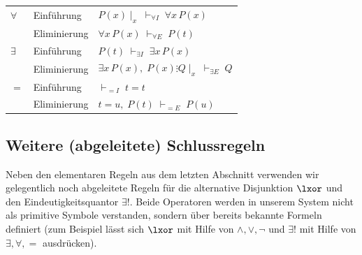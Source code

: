 \documentclass[main.tex]{subfiles}
\begin{document}
\begin{center}
\begin{tabularx}{\textwidth}{@{}l l X@{}}
    $\forall$
      & Einführung
      & \label{rule:UI}%
        \(P(x)\mid_x \;\vdash_{\forall I}\; \forall x\,P(x)\) \\[0.6ex]
      & Eliminierung
      & \label{rule:UE}%
        \(\forall x\,P(x) \;\vdash_{\forall E}\; P(t)\) \\[0.9ex]

    $\exists$
      & Einführung
      & \label{rule:EI}%
        \(P(t) \;\vdash_{\exists I}\; \exists x\,P(x)\) \\[0.6ex]
      & Eliminierung
      & \label{rule:EE}%
        \(\exists x\,P(x),\; P(x)\vdots Q\mid_x
          \;\vdash_{\exists E}\; Q\) \\[0.9ex]

    $=$
      & Einführung
      & \label{rule:II}%
        \(\vdash_{= I}\; t = t\) \\[0.6ex]
      & Eliminierung
      & \label{rule:IE}%
        \(t = u,\; P(t) \;\vdash_{= E}\; P(u)\) \\
    \bottomrule
  \end{tabularx}
\end{center}

\subsection{Weitere (abgeleitete) Schlussregeln}

Neben den elementaren Regeln aus dem letzten Abschnitt verwenden wir
gelegentlich noch abgeleitete Regeln für die alternative Disjunktion \(\lxor\)
und den Eindeutigkeitsquantor \(\exists!\).
Beide Operatoren werden in unserem System nicht als primitive Symbole
verstanden, sondern über bereits bekannte Formeln definiert
(zum Beispiel lässt sich \(\lxor\) mit Hilfe von \(\land,\lor,\neg\) und
\(\exists!\) mit Hilfe von \(\exists,\forall,=\) ausdrücken).
\end{document}
